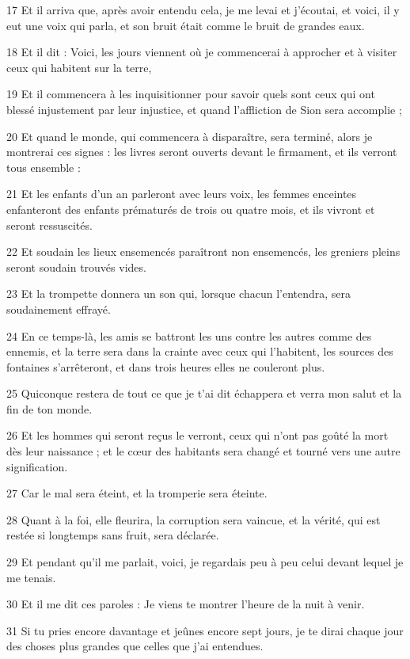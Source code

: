\par 17 Et il arriva que, après avoir entendu cela, je me levai et j'écoutai, et voici, il y eut une voix qui parla, et son bruit était comme le bruit de grandes eaux.
\par 18 Et il dit : Voici, les jours viennent où je commencerai à approcher et à visiter ceux qui habitent sur la terre,
\par 19 Et il commencera à les inquisitionner pour savoir quels sont ceux qui ont blessé injustement par leur injustice, et quand l'affliction de Sion sera accomplie ;
\par 20 Et quand le monde, qui commencera à disparaître, sera terminé, alors je montrerai ces signes : les livres seront ouverts devant le firmament, et ils verront tous ensemble :
\par 21 Et les enfants d'un an parleront avec leurs voix, les femmes enceintes enfanteront des enfants prématurés de trois ou quatre mois, et ils vivront et seront ressuscités.
\par 22 Et soudain les lieux ensemencés paraîtront non ensemencés, les greniers pleins seront soudain trouvés vides.
\par 23 Et la trompette donnera un son qui, lorsque chacun l'entendra, sera soudainement effrayé.
\par 24 En ce temps-là, les amis se battront les uns contre les autres comme des ennemis, et la terre sera dans la crainte avec ceux qui l'habitent, les sources des fontaines s'arrêteront, et dans trois heures elles ne couleront plus.
\par 25 Quiconque restera de tout ce que je t'ai dit échappera et verra mon salut et la fin de ton monde.
\par 26 Et les hommes qui seront reçus le verront, ceux qui n'ont pas goûté la mort dès leur naissance ; et le cœur des habitants sera changé et tourné vers une autre signification.
\par 27 Car le mal sera éteint, et la tromperie sera éteinte.
\par 28 Quant à la foi, elle fleurira, la corruption sera vaincue, et la vérité, qui est restée si longtemps sans fruit, sera déclarée.
\par 29 Et pendant qu'il me parlait, voici, je regardais peu à peu celui devant lequel je me tenais.
\par 30 Et il me dit ces paroles : Je viens te montrer l'heure de la nuit à venir.
\par 31 Si tu pries encore davantage et jeûnes encore sept jours, je te dirai chaque jour des choses plus grandes que celles que j'ai entendues.

